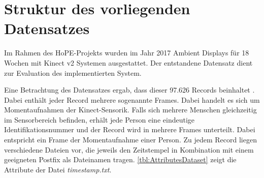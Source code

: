 \section{Struktur des vorliegenden Datensatzes}
\label{2-StrukturDatensatz}
Im Rahmen des HoPE-Projekts wurden im Jahr 2017 Ambient Displays für 18 Wochen mit Kinect v2 Systemen ausgestattet.
Der entstandene Datensatz dient zur Evaluation des implementierten System.

Eine Betrachtung des Datensatzes ergab, dass dieser 97.626 Records beinhaltet \citep{temiz_konzeption_2022}.
Dabei enthält jeder Record mehrere sogenannte Frames.
Dabei handelt es sich um Momentaufnahmen der Kinect-Sensorik.
Falls sich mehrere Menschen gleichzeitig im Sensorbereich befinden,
erhält jede Person eine eindeutige Identifikationsnummer
und der Record wird in mehrere Frames unterteilt.
Dabei entspricht ein Frame der Momentaufnahme einer Person.
Zu jedem Record liegen verschiedene Dateien vor,
die jeweils den Zeitstempel in Kombination mit einem geeigneten Postfix als Dateinamen tragen.
\autoref{tbl:AttributesDataset} zeigt die Attribute der Datei \emph{timestamp.txt}.
